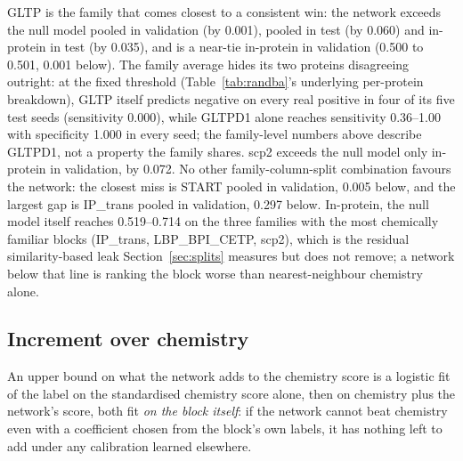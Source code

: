 GLTP is the family that comes closest to a consistent win: the network exceeds the null
model pooled in validation (by 0.001), pooled in test (by 0.060) and in-protein in test
(by 0.035), and is a near-tie in-protein in validation (0.500 to 0.501, 0.001 below). The
family average hides its two proteins disagreeing outright: at the fixed threshold
(Table~\ref{tab:randba}'s underlying per-protein breakdown), GLTP itself predicts
negative on every real positive in four of its five test seeds (sensitivity 0.000),
while GLTPD1 alone reaches sensitivity 0.36--1.00 with specificity 1.000 in every seed;
the family-level numbers above describe GLTPD1, not a property the family shares. scp2
exceeds the null model only in-protein in validation, by 0.072. No other
family-column-split combination favours the network: the closest miss is START pooled
in validation, 0.005 below, and the largest gap is IP\_trans pooled in validation, 0.297
below. In-protein, the null model itself reaches 0.519--0.714 on the three families with
the most chemically familiar blocks (IP\_trans, LBP\_BPI\_CETP, scp2), which is the
residual similarity-based leak Section~\ref{sec:splits} measures but does not remove; a
network below that line is ranking the block worse than nearest-neighbour chemistry
alone.

\subsection{Increment over chemistry}

An upper bound on what the network adds to the chemistry score is a logistic fit of the
label on the standardised chemistry score alone, then on chemistry plus the network's
score, both fit \emph{on the block itself}: if the network cannot beat chemistry even
with a coefficient chosen from the block's own labels, it has nothing left to add under
any calibration learned elsewhere.

